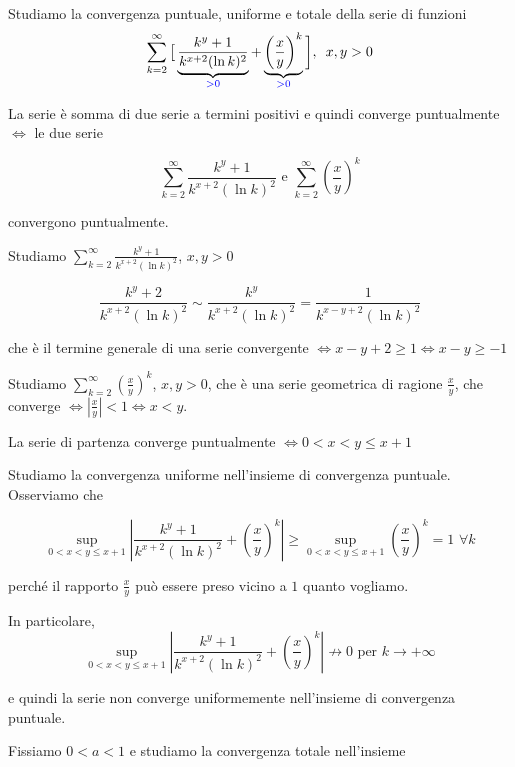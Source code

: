 \begin{exbar}
\begin{example}
	Studiamo la convergenza puntuale, uniforme e totale della serie di funzioni 
	\begin{equation*}
		\sum_{k=2}^{\infty}\big[ \underbrace{\frac{k^y+1}{k^{x+2}(\ln k)^2}}_{\color{blue}>0} + \underbrace{\left( \frac{x}{y} \right)^k}_{\color{blue}>0} \bigg], \,\,\, x,y >0
	\end{equation*} 
	
	La serie è somma di due serie a termini positivi e quindi converge puntualmente $\Leftrightarrow$ le due serie 
	
	$$\sum_{k=2}^{\infty} \frac{k^y+1}{k^{x+2}(\ln k)^2} \text{ e } \sum_{k=2}^{\infty}  \left( \frac{x}{y} \right)^k$$
	
	convergono puntualmente.
		
	Studiamo $\sum_{k=2}^{\infty} \frac{k^y+1}{k^{x+2}(\ln k)^2}$, $x,y >0$
	
	$$\frac{k^y+2}{k^{x+2}(\ln k)^2} \sim \frac{k^y}{k^{x+2}(\ln k)^2}=\frac{1}{k^{x-y+2}(\ln k)^2}$$
	
	che è il termine generale di una serie convergente $\Leftrightarrow x-y+2 \geq 1 \Leftrightarrow x-y \geq -1$
	
	Studiamo $\sum_{k=2}^{\infty} \left(\frac{x}{y}\right)^k$, $x,y>0$, che è una serie geometrica di ragione $\frac{x}{y}$, che converge $\Leftrightarrow |\frac{x}{y}|< 1 \Leftrightarrow x <y$.
	
	La serie di partenza converge puntualmente $\Leftrightarrow 0<x<y\leq x+1$\\

	\segnaposto

	Studiamo la convergenza uniforme nell'insieme di convergenza puntuale. Osserviamo che 
	
	$$\sup_{0<x< y\leq x+1}|\frac{k^y+1}{k^{x+2}(\ln k)^2}+\left( \frac{x}{y}\right)^k|\geq  \sup_{0<x< y\leq x+1} \left( \frac{x}{y}\right)^k=1\,\, \forall k$$ 
	
	perché il rapporto $\frac{x}{y}$ può essere preso vicino a $1$ quanto vogliamo.
	
	In particolare, 
	$$\sup_{0<x< y\leq x+1}|\frac{k^y+1}{k^{x+2}(\ln k)^2}+\left( \frac{x}{y}\right)^k|\nrightarrow 0 \text{ per } k \rightarrow +\infty$$
	
	e quindi la serie non converge uniformemente nell'insieme di convergenza puntuale.
	
	Fissiamo $0 < a  < 1$  e studiamo la convergenza totale nell'insieme 
	

\end{example}
\end{exbar}
